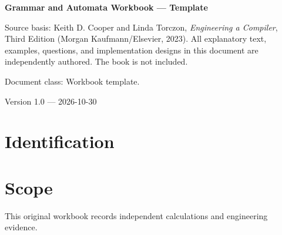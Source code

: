 \documentclass[10pt,letterpaper]{article}
\begin{document}
\hypersetup{pageanchor=false}%
\begin{titlepage}
\centering\vspace*{1.0in}
{\Huge\bfseries\textcolor{CompilerBlue}{Grammar and Automata Workbook --- Template}\par}
\vspace{.22in}{\Large Derivations, technical evidence and review\par}
\vspace{.4in}{\large Compiler Engineering Documentation Suite\par}
\vfill
\begin{minipage}{.86\linewidth}\small
Source basis: Keith D. Cooper and Linda Torczon, \emph{Engineering a Compiler}, Third Edition (Morgan Kaufmann/Elsevier, 2023). All explanatory text, examples, questions, and implementation designs in this document are independently authored. The book is not included.\par\medskip
Document class: Workbook template.
\end{minipage}
\vfill\textcolor{CompilerGray}{Version 1.0 --- 2026-10-30}\par
\end{titlepage}\hypersetup{pageanchor=true}
\tableofcontents\clearpage
\section{Identification}
\section{Scope}
 This original workbook records independent calculations and engineering evidence.
\end{document}
